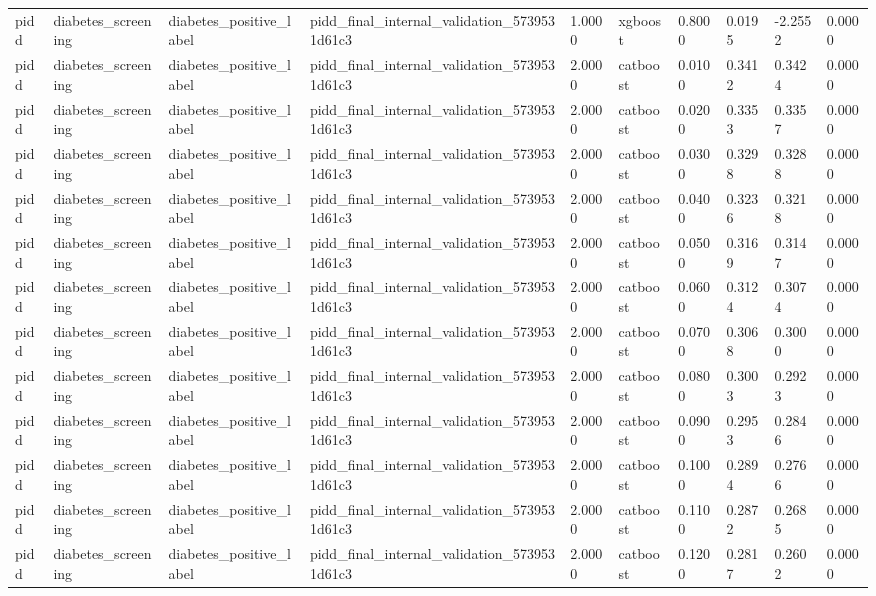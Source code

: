 \begin{tabular}{llllllllll}
pidd & diabetes\_screening & diabetes\_positive\_label & pidd\_final\_internal\_validation\_5739531d61c3 & 1.0000 & xgboost & 0.8000 & 0.0195 & -2.2552 & 0.0000 \\
pidd & diabetes\_screening & diabetes\_positive\_label & pidd\_final\_internal\_validation\_5739531d61c3 & 2.0000 & catboost & 0.0100 & 0.3412 & 0.3424 & 0.0000 \\
pidd & diabetes\_screening & diabetes\_positive\_label & pidd\_final\_internal\_validation\_5739531d61c3 & 2.0000 & catboost & 0.0200 & 0.3353 & 0.3357 & 0.0000 \\
pidd & diabetes\_screening & diabetes\_positive\_label & pidd\_final\_internal\_validation\_5739531d61c3 & 2.0000 & catboost & 0.0300 & 0.3298 & 0.3288 & 0.0000 \\
pidd & diabetes\_screening & diabetes\_positive\_label & pidd\_final\_internal\_validation\_5739531d61c3 & 2.0000 & catboost & 0.0400 & 0.3236 & 0.3218 & 0.0000 \\
pidd & diabetes\_screening & diabetes\_positive\_label & pidd\_final\_internal\_validation\_5739531d61c3 & 2.0000 & catboost & 0.0500 & 0.3169 & 0.3147 & 0.0000 \\
pidd & diabetes\_screening & diabetes\_positive\_label & pidd\_final\_internal\_validation\_5739531d61c3 & 2.0000 & catboost & 0.0600 & 0.3124 & 0.3074 & 0.0000 \\
pidd & diabetes\_screening & diabetes\_positive\_label & pidd\_final\_internal\_validation\_5739531d61c3 & 2.0000 & catboost & 0.0700 & 0.3068 & 0.3000 & 0.0000 \\
pidd & diabetes\_screening & diabetes\_positive\_label & pidd\_final\_internal\_validation\_5739531d61c3 & 2.0000 & catboost & 0.0800 & 0.3003 & 0.2923 & 0.0000 \\
pidd & diabetes\_screening & diabetes\_positive\_label & pidd\_final\_internal\_validation\_5739531d61c3 & 2.0000 & catboost & 0.0900 & 0.2953 & 0.2846 & 0.0000 \\
pidd & diabetes\_screening & diabetes\_positive\_label & pidd\_final\_internal\_validation\_5739531d61c3 & 2.0000 & catboost & 0.1000 & 0.2894 & 0.2766 & 0.0000 \\
pidd & diabetes\_screening & diabetes\_positive\_label & pidd\_final\_internal\_validation\_5739531d61c3 & 2.0000 & catboost & 0.1100 & 0.2872 & 0.2685 & 0.0000 \\
pidd & diabetes\_screening & diabetes\_positive\_label & pidd\_final\_internal\_validation\_5739531d61c3 & 2.0000 & catboost & 0.1200 & 0.2817 & 0.2602 & 0.0000 \\

\end{tabular}
